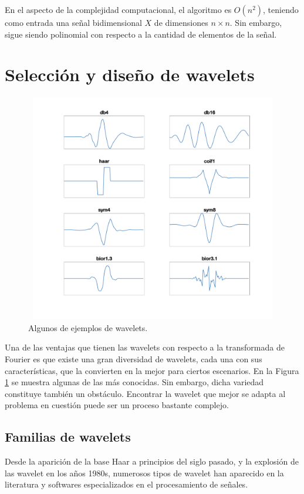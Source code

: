 En el aspecto de la complejidad computacional, el algoritmo es $O(n^2)$, teniendo como entrada
una señal bidimensional $X$ de dimensiones  $n \times n $. Sin embargo, sigue siendo polinomial 
con respecto a la cantidad de elementos de la señal.

\section{Selección y diseño de wavelets}\label{design-selection-wavelets}

\begin{figure}[!h]
	\includegraphics[width=15cm,height=10cm]{Graphics/wavelets.png}
	\caption{Algunos de ejemplos de wavelets.}\label{fig:wavelets}
\end{figure}

Una de las ventajas que tienen las wavelets con respecto a la transformada de Fourier es que 
existe una gran diversidad de wavelets, cada una con sus características, que 
la convierten en la mejor para ciertos escenarios. En la Figura \ref{fig:wavelets} se muestra algunas de las
más conocidas. Sin embargo, dicha variedad constituye también un obstáculo.
Encontrar la wavelet que mejor se adapta al problema en cuestión puede ser un proceso bastante complejo.

\subsection{Familias de wavelets}\label{wavelets-families}

Desde la aparición de la base Haar a principios del siglo pasado, y la explosión de las wavelet en los 
años 1980s, numerosos tipos de wavelet han aparecido en la literatura y softwares especializados en el 
procesamiento de señales. 

